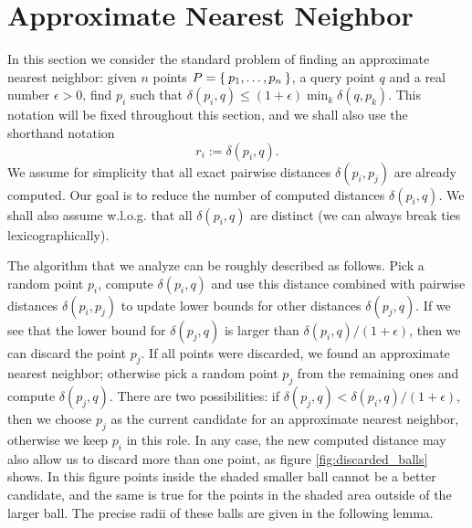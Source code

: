 \documentclass[a4paper,USenglish]{socg-lipics-v2018}
\newcommand{\eps}{\epsilon}
\newcommand{\dist}{\delta}
\begin{document}


\section{Approximate Nearest Neighbor}

In this section we consider the standard problem of finding an approximate nearest neighbor: given
$n$ points $P = \Set{p_1, \dots, p_n}$, a query point $q$ and a real number $\eps > 0$,
find $p_i$ such that $\dist(p_i, q) \leq (1 + \eps) \min_{k} \dist(q, p_k)$. This notation will be fixed throughout this 
section, and we shall also use the shorthand notation
\[
    r_i := \dist(p_i, q).
\]
We assume for simplicity
that all exact pairwise distances $\dist(p_i, p_j)$ are already computed.
Our goal is to reduce the number of computed distances $\dist(p_i, q)$. We shall also assume w.l.o.g.
that all $\dist(p_i, q)$ are distinct (we can always break ties lexicographically).


The algorithm that we analyze can be roughly described as follows. 
Pick a random point $p_i$,
compute $\dist(p_i, q)$ and use this distance combined with pairwise distances $\dist(p_i, p_j)$
to update lower bounds for other distances $\dist(p_j, q)$.
If we see that the lower bound for $\dist(p_j, q)$ is larger than $\dist(p_i, q) / (1+\eps)$, then 
we can discard the point $p_j$. If all points were discarded, we found an approximate nearest neighbor;
otherwise pick a random point $p_j$ from the remaining ones and compute $\dist(p_j, q)$.
There are two possibilities: if $\dist(p_j, q) < \dist(p_i, q) / (1+\eps)$,
then we choose $p_j$ as the current candidate for an approximate nearest neighbor,
otherwise we keep $p_i$ in this role. In any case, the new computed distance
may also allow us to discard more than one point, as figure \ref{fig:discarded_balls} shows. In
this figure points inside the shaded smaller ball cannot be a better candidate,
and the same is true for the points in the shaded area outside of the larger ball.
The precise radii of these balls are given in the following lemma.
\end{document}
